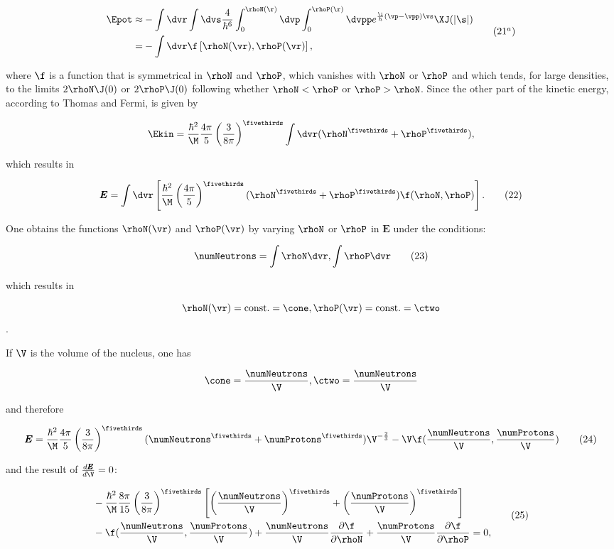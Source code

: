 \documentclass{article}
\newcommand{\var}[1]{\pmb{#1}}
\newcommand{\dXdY}[2]{
\frac{d{#1}}{d{#2}}
}
\newcommand{\pdXdY}[2]{
\frac{\partial {#1}}{\partial {#2}}
}
\newcommand{\E}{\var{E}}
\newcommand{\intXY}[3]{\int_{#1}^{#2}{#3}}
\newcommand{\nequ}[2]{
\begin{equation*}
#1
\tag{#2}
\end{equation*}
}
\newcommand{\uequ}[1]{
\begin{equation*}
#1
\end{equation*}
}
\begin{document}
\nequ{
\begin{split}
\Epot \approx & -\int \dvr \int \dvs \frac{4}{\hbar^6}\intXY{0}{\rhoN(\r)}{
  \dvp\intXY{0}{\rhoP(\r)}{
    \dvpp \exp{\frac{\i}{\hbar}(\vp-\vpp)\vs}\XJ(|\s|)
  }
} \\
 = & -\int \dvr \f \left[ \rhoN(\vr), \rhoP(\vr) \right],
\end{split}
}{$21^a$}

where $\f$ is a function that is symmetrical in $\rhoN$ and $\rhoP$, which vanishes with $\rhoN$ or $\rhoP$ and which tends, for large densities, to the limits $2\rhoN\J(0)$ or $2\rhoP\J(0)$ following whether $\rhoN < \rhoP$ or $\rhoP > \rhoN$.
Since the other part of the kinetic energy, according to Thomas and Fermi, is given by

\uequ{
\Ekin = \frac{\hbar^2}{\M}\frac{4\pi}{5}\left( \frac{3}{8\pi} \right)^{\fivethirds}
\int \dvr(\rhoN^{\fivethirds} + \rhoP^{\fivethirds}),
}

which results in

\nequ{
\E = \int \dvr \left[ \frac{\hbar^2}{\M}\left(\frac{4\pi}{5}\right)^{\fivethirds}
   (\rhoN^{\fivethirds} + \rhoP^{\fivethirds}) \f(\rhoN, \rhoP) \right].
}{22}

One obtains the functions $\rhoN(\vr)$ and $\rhoP(\vr)$ by varying $\rhoN$ or $\rhoP$ in $\E$ under the conditions:

\nequ{
\numNeutrons = \int\rhoN\dvr, \int\rhoP\dvr
}{23}

which results in

\uequ{
\rhoN(\vr) = \text{const.} = \cone, \rhoP(\vr) = \text{const.} = \ctwo
}.

If $\V$ is the volume of the nucleus, one has

\uequ{
\cone = \frac{\numNeutrons}{\V}, \ctwo = \frac{\numNeutrons}{\V}
}

and therefore

\nequ{
\E = \frac{\hbar^2}{\M}\frac{4\pi}{5}\left( \frac{3}{8\pi} \right)^\fivethirds
(\numNeutrons^\fivethirds + \numProtons^\fivethirds)\V^{-\frac{2}{3}} 
  - \V\f(\frac{\numNeutrons}{\V}, \frac{\numProtons}{\V})
}{24}

and the result of $\dXdY{\E}{\V} = 0$:

\nequ{
\begin{split}
&-\frac{\hbar^2}{\M}\frac{8\pi}{15} \left( \frac{3}{8\pi} \right)^\fivethirds\left[ 
\left( \frac{\numNeutrons}{\V} \right)^\fivethirds +
\left( \frac{\numProtons}{\V} \right)^\fivethirds
\right] \\
&-\f(\frac{\numNeutrons}{\V}, \frac{\numProtons}{\V}) + \frac{\numNeutrons}{\V}\pdXdY{\f}{\rhoN}
+ \frac{\numProtons}{\V}\pdXdY{\f}{\rhoP} = 0,
\end{split}
}{25}
\end{document}
